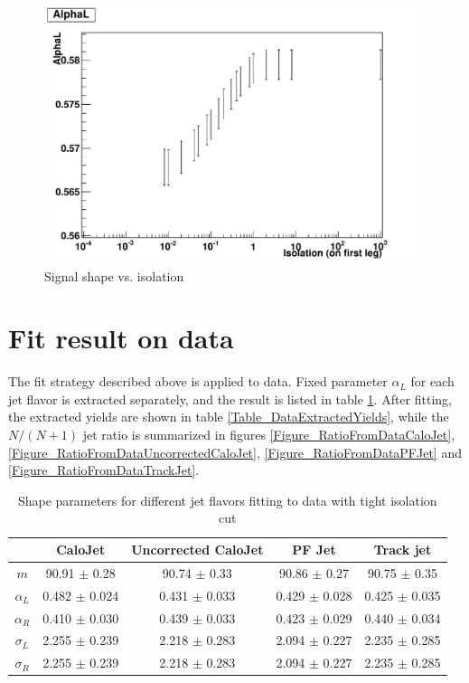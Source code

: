 \documentclass[10pt,a4paper,onecolumn]{article}
\begin{document}
\begin{figure}
\includegraphics[width=110mm]{AlphaLVsIsolation_ReasonableIsolation.pdf}
\caption{Signal shape vs. isolation}
\label{Figure_SignalShapeVsIsolation}
\end{figure}

\section{Fit result on data}

The fit strategy described above is applied to data.  Fixed parameter $\alpha_L$ for each jet flavor is extracted separately, and the result is listed in table \ref{Table_DataAlphaL}.
After fitting, the extracted yields are shown in table \ref{Table_DataExtractedYields}, while the $N/(N+1)$ jet ratio is summarized in figures \ref{Figure_RatioFromDataCaloJet},
\ref{Figure_RatioFromDataUncorrectedCaloJet}, \ref{Figure_RatioFromDataPFJet} and \ref{Figure_RatioFromDataTrackJet}.

\begin{table}
\caption{Shape parameters for different jet flavors fitting to data with tight isolation cut}
\centering
   \begin{tabular}{|c|c|c|c|c|}
      \hline
      & CaloJet & Uncorrected CaloJet & PF Jet & Track jet \\\hline
      $m$ & 90.91 $\pm$ 0.28 & 90.74 $\pm$ 0.33 & 90.86 $\pm$ 0.27 & 90.75 $\pm$ 0.35 \\\hline
      $\alpha_L$ & 0.482 $\pm$ 0.024 & 0.431 $\pm$ 0.033 & 0.429 $\pm$ 0.028 & 0.425 $\pm$ 0.035 \\\hline
      $\alpha_R$ & 0.410 $\pm$ 0.030 & 0.439 $\pm$ 0.033 & 0.423 $\pm$ 0.029 & 0.440 $\pm$ 0.034 \\\hline
      $\sigma_L$ & 2.255 $\pm$ 0.239 & 2.218 $\pm$ 0.283 & 2.094 $\pm$ 0.227 & 2.235 $\pm$ 0.285 \\\hline
      $\sigma_R$ & 2.255 $\pm$ 0.239 & 2.218 $\pm$ 0.283 & 2.094 $\pm$ 0.227 & 2.235 $\pm$ 0.285 \\\hline
   \end{tabular}
   \label{Table_DataAlphaL}
\end{table}
\end{document}
